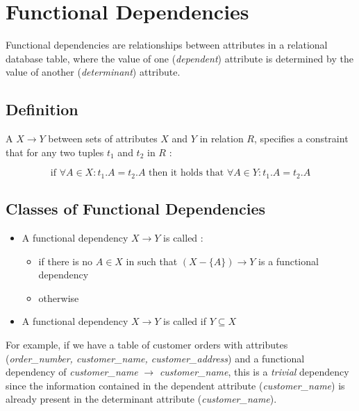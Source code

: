 \section{Functional Dependencies}

Functional dependencies are relationships between attributes in a relational database table, where the value of one (\textit{dependent}) attribute is determined by the value of another (\textit{determinant}) attribute.

\subsection{Definition}

A  $X \rightarrow Y$ between sets of attributes $X$ and $Y$ in relation $R$, specifies a constraint that for any two tuples $t_1$ and $t_2$ in $R$ :

\begin{equation*}
\text{if } \forall A \in X : t_1.A = t_2.A \text{ then it holds that } \forall A \in Y : t_1.A = t_2.A
\end{equation*}

\newpage
\subsection{Classes of Functional Dependencies}

\begin{itemize}
    \item A functional dependency $X \rightarrow Y$ is called :
    \begin{itemize}
        \item {} if there is no $A \in X$ in such that $(X - \{A\}) \rightarrow Y$ is a functional dependency
        \item {} otherwise
    \end{itemize}
    \item A functional dependency $X \rightarrow Y$ is called  if $Y \subseteq X$ 
\end{itemize}

For example, if we have a table of customer orders with attributes (\textit{order\_number, customer\_name, customer\_address}) and a functional dependency of \textit{customer\_name} $\rightarrow$ \textit{customer\_name}, this is a \textit{trivial} dependency since the information contained in the dependent attribute (\textit{customer\_name}) is already present in the determinant attribute (\textit{customer\_name}).

